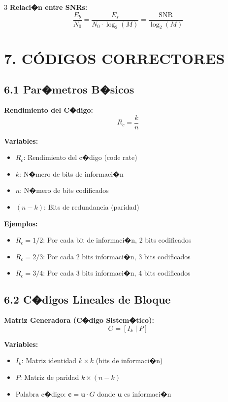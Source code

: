 ﻿\documentclass[8pt,a4paper]{article}
\begin{document}
\begin{multicols}{3}
\textbf{Relaci�n entre SNRs:}
\[
\frac{E_b}{N_0} = \frac{E_s}{N_0 \cdot \log_2(M)} = \frac{\text{SNR}}{\log_2(M)}
\]

\vspace{-2mm}
\section*{\color{sectioncolor}\normalsize 7. CÓDIGOS CORRECTORES}
\vspace{-3mm}

\subsection*{\small 6.1 Par�metros B�sicos}
\vspace{-2mm}

\textbf{Rendimiento del C�digo:}
\[
R_c = \frac{k}{n}
\]

\textbf{Variables:}
\begin{itemize}[leftmargin=*,itemsep=0pt]
    \item $R_c$: Rendimiento del c�digo (code rate)
    \item $k$: N�mero de bits de informaci�n
    \item $n$: N�mero de bits codificados
    \item $(n-k)$: Bits de redundancia (paridad)
\end{itemize}

\textbf{Ejemplos:}
\begin{itemize}[leftmargin=*,itemsep=0pt]
    \item $R_c = 1/2$: Por cada bit de informaci�n, 2 bits codificados
    \item $R_c = 2/3$: Por cada 2 bits informaci�n, 3 bits codificados
    \item $R_c = 3/4$: Por cada 3 bits informaci�n, 4 bits codificados
\end{itemize}

\vspace{-2mm}
\subsection*{\small 6.2 C�digos Lineales de Bloque}
\vspace{-2mm}

\textbf{Matriz Generadora (C�digo Sistem�tico):}
\[
G = [I_k \mid P]
\]

\textbf{Variables:}
\begin{itemize}[leftmargin=*,itemsep=0pt]
    \item $I_k$: Matriz identidad $k \times k$ (bits de informaci�n)
    \item $P$: Matriz de paridad $k \times (n-k)$
    \item Palabra c�digo: $\mathbf{c} = \mathbf{u} \cdot G$ donde $\mathbf{u}$ es informaci�n
\end{itemize}


\end{multicols}
\end{document}
